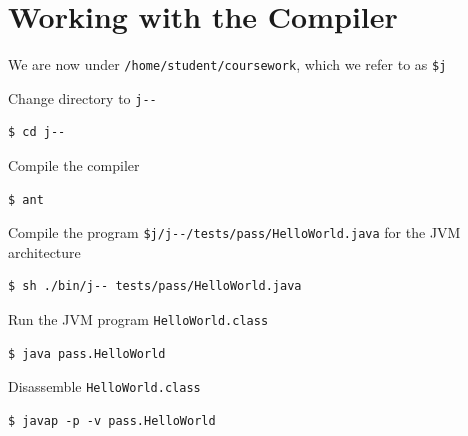 \documentclass[8pt,a4paper,compress]{beamer}
\begin{document}
\section{Working with the \protect \jmm Compiler}
\begin{frame}[fragile]
\pause

We are now under \lstinline{/home/student/coursework}, which we refer to as \lstinline{$j}

\pause\bigskip

Change directory to \lstinline{j--}

\begin{tcolorbox}[enhanced,drop shadow southwest,sharp corners,size=fbox,colback=black]
\begin{lstlisting}[style=terminal]
$ cd j--
\end{lstlisting}
\end{tcolorbox}

\pause\bigskip

Compile the \jmm compiler

\begin{tcolorbox}[enhanced,drop shadow southwest,sharp corners,size=fbox,colback=black]
\begin{lstlisting}[style=terminal]
$ ant
\end{lstlisting}
\end{tcolorbox}

\pause\bigskip

Compile the \jmm program \lstinline{$j/j--/tests/pass/HelloWorld.java} for the JVM architecture

\begin{tcolorbox}[enhanced,drop shadow southwest,sharp corners,size=fbox,colback=black]
\begin{lstlisting}[style=terminal]
$ sh ./bin/j-- tests/pass/HelloWorld.java
\end{lstlisting}
\end{tcolorbox}

\pause\bigskip

Run the JVM program \lstinline{HelloWorld.class}

\begin{tcolorbox}[enhanced,drop shadow southwest,sharp corners,size=fbox,colback=black]
\begin{lstlisting}[style=terminal]
$ java pass.HelloWorld
\end{lstlisting}
\end{tcolorbox}

\pause\bigskip

Disassemble \lstinline{HelloWorld.class}

\begin{tcolorbox}[enhanced,drop shadow southwest,sharp corners,size=fbox,colback=black]
\begin{lstlisting}[style=terminal]
$ javap -p -v pass.HelloWorld
\end{lstlisting}
\end{tcolorbox}
\end{frame}
\end{document}
